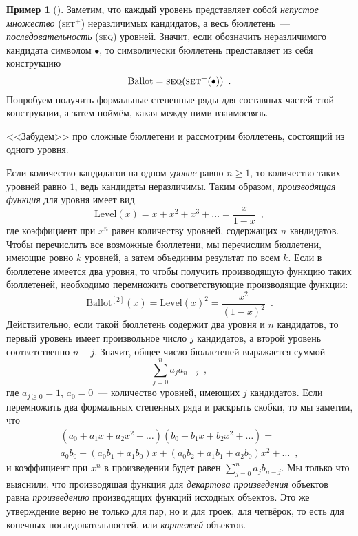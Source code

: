 \documentclass[a5paper]{article}
\theoremstyle{definition}
\newtheorem{example}{Пример}
\begin{document}
\begin{example}[{\cite[Example 10, p.36]{species}}]
Заметим, что каждый уровень представляет собой \textit{непустое множество} 
(\textsc{set}\( ^{+} \)) неразличимых кандидатов, а весь бюллетень~--- 
\textit{последовательность} (\textsc{seq}) уровней. Значит, если обозначить 
неразличимого кандидата символом \( \bullet \), то символически бюллетень 
представляет из себя конструкцию
\[
	\mathrm{Ballot} = \text{\textsc{seq}(\textsc{set$^{+}$}($\bullet$))}
	\enspace .
\]
Попробуем получить формальные степенные ряды для составных частей этой 
конструкции, а затем поймём, какая между ними взаимосвязь.

<<Забудем>> про сложные бюллетени и рассмотрим бюллетень, состоящий из одного 
уровня.

Если количество кандидатов на одном \textit{уровне} равно \( n \geq 1 \), то 
количество таких уровней равно \( 1 \), ведь кандидаты неразличимы. Таким 
образом, \textit{производящая функция} для уровня имеет вид
\[
	\mathrm{Level}(x) = x + x^2 + x^3 + \ldots = \dfrac{x}{1-x} \enspace ,
\]
где коэффициент при \( x^n \)  равен количеству уровней, содержащих \( n \) 
кандидатов. Чтобы перечислить все возможные бюллетени, мы перечислим бюллетени, 
имеющие ровно \( k \) уровней, а затем объединим результат по всем \( k \). 
Если в бюллетене имеется два уровня, то чтобы получить производящую функцию 
таких бюллетеней, необходимо перемножить соответствующие производящие функции:
\[
	\mathrm{Ballot}^{[2]} (x) = \mathrm{Level}(x)^2 = \dfrac{x^2}{(1 - x)^2} 
	\enspace .
\]
Действительно, если такой бюллетень содержит два уровня и \( n \) кандидатов, 
то первый уровень имеет произвольное число \( j \) кандидатов, а второй уровень 
соответственно \( n-j \). Значит, общее число бюллетеней выражается суммой
\[
	\sum_{j=0}^{n} a_j a_{n-j} \enspace ,
\]
где \( a_{j \geq 0} = 1 \), \( a_0 = 0 \)~--- количество уровней, имеющих \( j 
\) кандидатов. Если перемножить два формальных степенных ряда и раскрыть 
скобки, то мы заметим, что
\begin{multline*}
	\left(a_0 + a_1 x + a_2 x^2 + \ldots
    \right)
    (b_0 + b_1 x + b_2 x^2 + \ldots) =\\
     a_0 b_0 
	+ (a_0 b_1 + a_1 b_0) x + (a_0 b_2 + a_1 b_1 + a_2 b_0) x^2 + \ldots
	\enspace ,
\end{multline*}
и коэффициент при \( x^n \) в произведении будет равен \( \sum_{j=0}^{n} a_j 
b_{n-j} \). Мы только что выяснили, что производящая функция для 
\textit{декартова произведения} объектов равна \textit{произведению} 
производящих функций исходных объектов. Это же утверждение верно не только для 
пар, но и для троек, для четвёрок, то есть для конечных последовательностей, 
или \textit{кортежей}
объектов.


\end{example}
\end{document}
